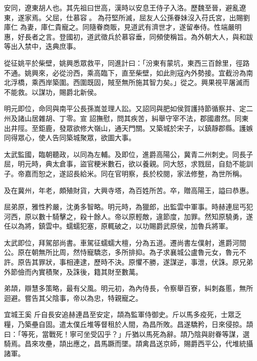 \begin{pinyinscope}
 安同，遼東胡人也。其先祖曰世高，漢時以安息王侍子入洛。歷魏至晉，避亂遼東，遂家焉。父屈，仕慕容。為苻堅所滅，屈友人公孫眷妹沒入苻氏宮，出賜劉庫仁
 為妻，庫仁貴寵之。同隨眷商販，見道武有濟世才，遂留奉侍。性端嚴明惠，好長者之言。登國初，道武徵兵於慕容垂，同頻使稱旨。為外朝大人，與和跋等出入禁中，迭典庶事。



 從征姚平於柴壁，姚興悉眾救平，同進計曰：「汾東有蒙坑，東西三百餘里，徑路不通。姚興來，必從汾西，乘高臨下，直至柴壁，如此則寇內外勢接。宜截汾為南北浮橋，乘西岸築圍。西圍既固，賊至無所施其智力矣。」從之。興果視平屠滅而不能救。以謀功，賜爵北新侯。



 明元即位，命同與南平公長孫嵩並理人訟。又詔同與肥如侯賀護持節循察并、定二州及諸山居雜胡、丁零。宣
 詔撫慰，問其疾苦，糾舉守宰不法，郡國肅然。同東出井陘。至鉅鹿，發眾欲修大嶺山，通天門關。又築城於宋子，以鎮靜郡縣。護嫉同得眾心，使人告同築城聚眾，欲圖大事。



 太武監國，臨朝聽政，以同為左輔。及即位，進爵高陽公，冀青二州刺史。同長子屈，明元時，典太倉事，盜官粳米數石，欲以養親。同大怒，求戮屈，自劾不能訓子。帝嘉而恕之，遂詔長給米。同在官明察，長於校閱，家法修整，為世所稱。



 及在冀州，年老，頗殖財貨，大興寺塔，為百姓所苦。卒，贈高陽王，謚曰恭惠。



 屈弟原，雅性矜嚴，沈勇多智略。明元時，為獵郎，出監雲中軍事。時赫連屈丐犯
 河西，原以數十騎擊之，殺十餘人。帝以原輕敵，違節度，加罪。然知原驍勇，遂任以為將，鎮雲中。蠕蠕犯塞，原輒破之，以功賜爵武原侯，加魯兵將軍。



 太武即位，拜駕部尚書。車駕征蠕蠕大檀，分為五道。遷尚書左僕射，進爵河間公。原在朝無所比周，然恃寵驕恣，多所排抑。為子求襄城公盧魯元女，魯元不許。原告其罪狀，事相連逮，歷時不決。原懼不勝，遂謀逆，事泄，伏誅。原兄弟外節儉而內實積聚，及誅後，籍其財至數萬。



 弟頡，辯慧多策略，最有父風。明元初，為內侍長，令察舉百寮，糾刺姦慝，無所迴避。嘗告其父陰事，帝以為忠，特親寵之。



 宜城王奚
 斤自長安追赫連昌至安定，頡為監軍侍御史。斤以馬多疫死，士眾乏糧，乃築壘自固。遣太僕丘堆等督租於人間，為昌所敗。昌遂驕矜，日來侵掠。頡曰：「等死，當戰死！寧可坐受囚乎？」斤猶以馬死為辭。頡乃陰與尉眷等謀，選騎焉。昌來攻壘，頡出應之，昌馬蹶而墜。頡禽昌送京師，賜爵西平公，代堆統攝諸軍。




\end{pinyinscope}
